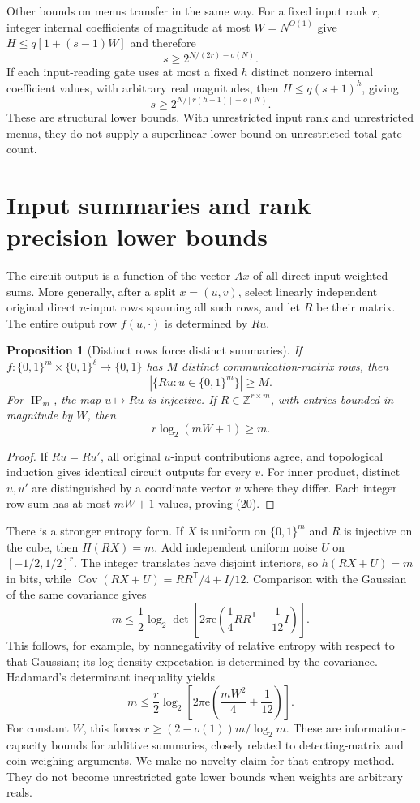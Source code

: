 \documentclass[11pt]{article}
\newtheorem{proposition}[theorem]{Proposition}
\theoremstyle{definition}
\newcommand{\bits}{\{0,1\}}
\newcommand{\Z}{\mathbb Z}
\newcommand{\ip}{\operatorname{IP}}
\newcommand{\Eul}{\mathrm e}
\DeclareMathOperator{\Cov}{Cov}
\begin{document}
Other bounds on menus transfer in the same way. For a fixed input rank \(r\), integer internal coefficients of magnitude at most \(W=N^{O(1)}\) give \(H\le q[1+(s-1)W]\) and therefore
\[
 s\ge2^{N/(2r)-o(N)}.
\]
If each input-reading gate uses at most a fixed \(h\) distinct nonzero internal coefficient values, with arbitrary real magnitudes, then \(H\le q(s+1)^h\), giving
\[
 s\ge2^{N/[r(h+1)]-o(N)}.
\]
These are structural lower bounds. With unrestricted input rank and unrestricted menus, they do not supply a superlinear lower bound on unrestricted total gate count.


\section{Input summaries and rank--precision lower bounds}\label{sec:summary}
The circuit output is a function of the vector \(Ax\) of all direct input-weighted sums. More generally, after a split \(x=(u,v)\), select linearly independent original direct \(u\)-input rows spanning all such rows, and let \(R\) be their matrix. The entire output row \(f(u,\cdot)\) is determined by \(Ru\).

\begin{proposition}[Distinct rows force distinct summaries]\label{prop:summary}
If \(f:\bits^m\times\bits^\ell\to\bits\) has \(M\) distinct communication-matrix rows, then
\[
 |\{Ru:u\in\bits^m\}|\ge M.
\]
For \(\ip_m\), the map \(u\mapsto Ru\) is injective. If \(R\in\Z^{r\times m}\), with entries bounded in magnitude by \(W\), then
\[
 r\log_2(mW+1)\ge m.                                    \tag{20}
\]
\end{proposition}
\begin{proof}
If \(Ru=Ru'\), all original \(u\)-input contributions agree, and topological induction gives identical circuit outputs for every \(v\). For inner product, distinct \(u,u'\) are distinguished by a coordinate vector \(v\) where they differ. Each integer row sum has at most \(mW+1\) values, proving (20).
\end{proof}

There is a stronger entropy form. If \(X\) is uniform on \(\bits^m\) and \(R\) is injective on the cube, then \(H(RX)=m\). Add independent uniform noise \(U\) on \([-1/2,1/2]^r\). The integer translates have disjoint interiors, so
\(h(RX+U)=m\) in bits, while
\(\Cov(RX+U)=RR^\mathsf T/4+I/12\).
Comparison with the Gaussian of the same covariance gives
\[
 m\le\frac12\log_2\det\!\left[
 2\pi\Eul\left(\frac14 RR^\mathsf T+\frac1{12}I\right)
 \right].                                               \tag{21}
\]
This follows, for example, by nonnegativity of relative entropy with respect to that Gaussian; its log-density expectation is determined by the covariance. Hadamard's determinant inequality yields
\[
 m\le\frac r2\log_2\!\left[
 2\pi\Eul\left(\frac{mW^2}{4}+\frac1{12}\right)\right].    \tag{22}
\]
For constant \(W\), this forces \(r\ge(2-o(1))m/\log_2m\).
These are information-capacity bounds for additive summaries, closely related to detecting-matrix and coin-weighing arguments. We make no novelty claim for that entropy method. They do not become unrestricted gate lower bounds when weights are arbitrary reals.
\end{document}
